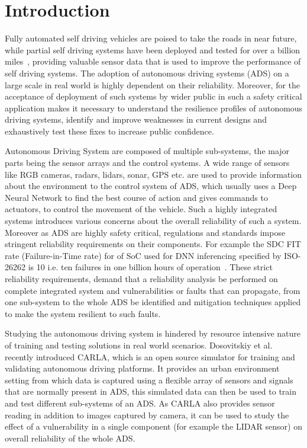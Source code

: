 \section{Introduction}

Fully automated self driving vehicles are poised to take the roads in near future, while partial self driving systems have been deployed and tested for over a billion miles~\cite{teslasr}, providing valuable sensor data that is used to improve the performance of self driving systems. The adoption of autonomous driving systems (ADS) on a large scale in real world is highly dependent on their reliability. Moreover, for the acceptance of deployment of such systems by wider public in such a safety critical application makes it necessary to understand the resilience profiles of autonomous driving systems, identify and improve weaknesses in current designs and exhaustively test these fixes to increase public confidence.

 
Autonomous Driving System are composed of multiple sub-systems, the major parts being the sensor arrays and the control systems. A wide range of sensors like RGB cameras, radars, lidars, sonar, GPS etc. are used to provide information about the environment to the control system of ADS, which usually uses a Deep Neural Network to find the best course of action and gives commands to actuators, to control the movement of the vehicle. Such a highly integrated systems introduces various concerns about the overall reliability of such a system. Moreover as ADS are highly safety critical, regulations and standards impose stringent reliability requirements on their components. For example the SDC FIT rate (Failure-in-Time rate) for of SoC used for DNN inferencing specified by ISO-26262 is 10 i.e. ten failures in one billion hours of operation~\cite{guanpeng17sc}. These strict reliability requirements, demand that a reliability analysis be performed on complete integrated system and vulnerabilities or faults that can propagate, from one sub-system to the whole ADS be identified and mitigation techniques applied to make the system resilient to such faults.

Studying the autonomous driving system is hindered by resource intensive nature of training and testing solutions in real world scenarios. Dosovitskiy et al.~\cite{carla18corl} recently introduced CARLA, which is an open source simulator for training and validating autonomous driving platforms. It provides an urban environment setting from which data is captured using a flexible array of sensors and signals that are normally present in ADS, this simulated data can then be used to train and test different sub-systems of an ADS. As CARLA also provides sensor reading in addition to images captured by camera, it can be used to study the effect of a vulnerability in a single component (for example the LIDAR sensor) on overall reliability of the whole ADS.


